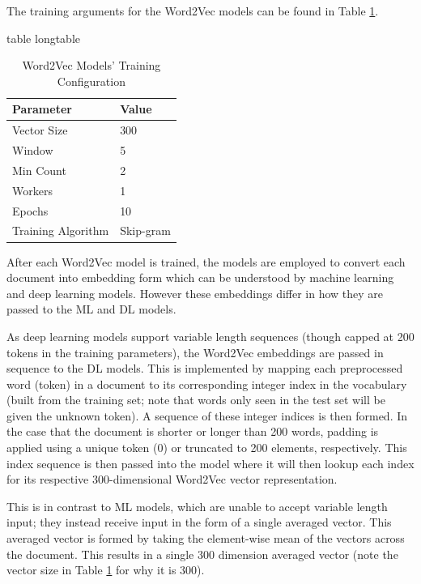 \documentclass[stu,12pt,floatsintext,donotrepeattitle]{apa7}
\makeatletter
\let\origcaption\caption
\newcommand{\@tabletype}{table}
\newcommand{\@longtabletype}{longtable}
\DeclareRobustCommand{\caption}[2][]{%
    \ifx\relax#1\relax
      \origcaption{#2}%
      \def\temp@cap{#2}%
    \else
      \origcaption[#1]{#2}%
      \def\temp@cap{#1}%
    \fi
    \ifx\@captype\@tabletype
      \ifx\@currenvir\@longtabletype\else
        \addcontentsline{lot}{table}{\protect\numberline{\thetable}{\ignorespaces\temp@cap}}%
      \fi
    \fi
  }%
\let\oldcaption\caption
\renewcommand{\caption}[2][]{%
    \oldcaption[#1]{#2}%
    \vspace{-12pt}%
  }%
\makeatother
\begin{document}
The training arguments for the Word2Vec models can be found in Table \ref{tab:word2vec_config}.

\vspace{25pt}

\begin{table}[H]
    \centering
    \caption{Word2Vec Models' Training Configuration}
    \label{tab:word2vec_config}
    \begin{tabular}{l l}
        \hline
        \textbf{Parameter} & \textbf{Value} \\
        \hline
        Vector Size & 300 \\
        Window & 5 \\
        Min Count & 2 \\
        Workers & 1 \\
        Epochs & 10 \\
        Training Algorithm & Skip-gram \\
        \hline
    \end{tabular}
\end{table}

After each Word2Vec model is trained, the models are employed to convert each document into embedding form which can be understood by machine learning and deep learning models. However these embeddings differ in how they are passed to the ML and DL models.

As deep learning models support variable length sequences (though capped at 200 tokens in the training parameters), the Word2Vec embeddings are passed in sequence to the DL models. This is implemented by mapping each preprocessed word (token) in a document to its corresponding integer index in the vocabulary (built from the training set; note that words only seen in the test set will be given the unknown token). A sequence of these integer indices is then formed. In the case that the document is shorter or longer than 200 words, padding is applied using a unique token (0) or truncated to 200 elements, respectively. This index sequence is then passed into the model where it will then lookup each index for its respective 300-dimensional Word2Vec vector representation. 

This is in contrast to ML models, which are unable to accept variable length input; they instead receive input in the form of a single averaged vector. This averaged vector is formed by taking the element-wise mean of the vectors across the document. This results in a single 300 dimension averaged vector (note the vector size in Table \ref{tab:word2vec_config} for why it is 300).
\end{document}
